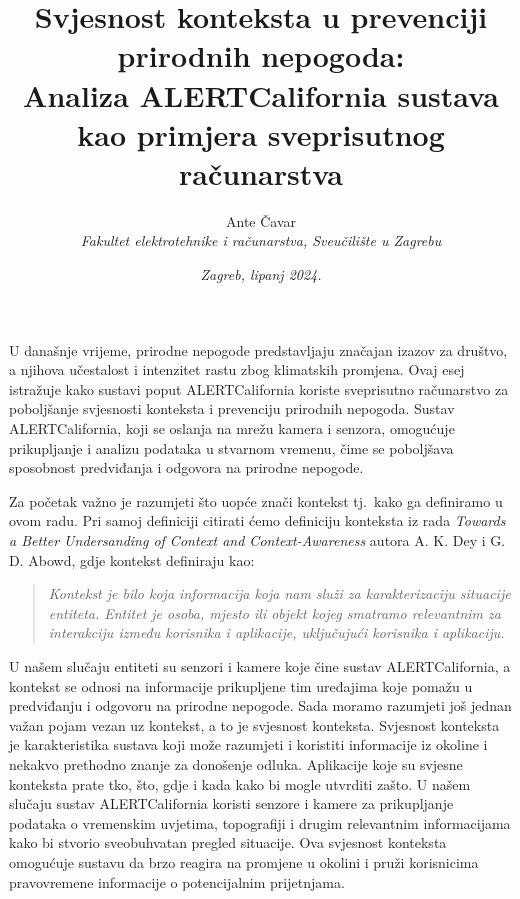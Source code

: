 \documentclass[12pt,a4paper]{article}
\title{Svjesnost konteksta u prevenciji prirodnih nepogoda: \\ Analiza ALERTCalifornia sustava kao primjera sveprisutnog računarstva}
\author{Ante Čavar \\ \textit{Fakultet elektrotehnike i računarstva, Sveučilište u Zagrebu}}
\date{\textit{Zagreb, lipanj 2024.}}
\begin{document}
\maketitle

\indent U današnje vrijeme, prirodne nepogode predstavljaju značajan izazov za društvo, a njihova učestalost i intenzitet rastu zbog klimatskih promjena. 
Ovaj esej istražuje kako sustavi poput ALERTCalifornia koriste sveprisutno računarstvo za poboljšanje svjesnosti konteksta i prevenciju prirodnih nepogoda. 
Sustav ALERTCalifornia, koji se oslanja na mrežu kamera i senzora, omogućuje prikupljanje i analizu podataka u stvarnom vremenu, čime se poboljšava sposobnost 
predviđanja i odgovora na prirodne nepogode.

\indent Za početak važno je razumjeti što uopće znači kontekst tj.\ kako ga definiramo u ovom radu. Pri samoj definiciji citirati ćemo definiciju konteksta iz 
rada \textit{Towards a Better Undersanding of Context and Context-Awareness} autora A. K. Dey i G. D. Abowd, gdje kontekst definiraju kao:

\begin{quote}
\textit{Kontekst je bilo koja informacija koja nam služi za karakterizaciju situacije entiteta. Entitet je osoba, mjesto ili objekt kojeg smatramo relevantnim za 
interakciju između korisnika i aplikacije, uključujući korisnika i aplikaciju.}\cite{dey2001context}
\end{quote}

U našem slučaju entiteti su senzori i kamere koje čine sustav ALERTCalifornia, a kontekst se odnosi na informacije prikupljene tim uređajima koje pomažu u
predviđanju i odgovoru na prirodne nepogode.\cite{alertcalifornia2024} Sada moramo razumjeti još jednan važan pojam vezan uz kontekst, a to je svjesnost konteksta.
Svjesnost konteksta je karakteristika sustava koji može razumjeti i koristiti informacije iz okoline i nekakvo prethodno znanje za donošenje odluka. Aplikacije koje
su svjesne konteksta prate tko, što, gdje i kada kako bi mogle utvrditi zašto. U našem slučaju sustav ALERTCalifornia koristi senzore i kamere za prikupljanje podataka 
o vremenskim uvjetima, topografiji i drugim relevantnim informacijama kako bi stvorio sveobuhvatan pregled situacije. Ova svjesnost konteksta omogućuje sustavu da brzo 
reagira na promjene u okolini i pruži korisnicima pravovremene informacije o potencijalnim prijetnjama.
\end{document}
